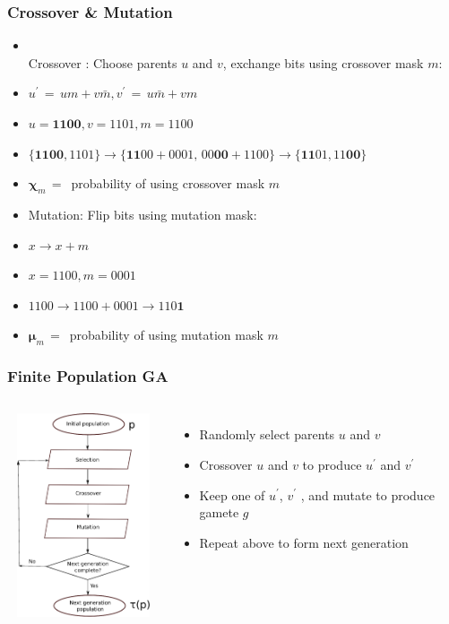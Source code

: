 \documentclass[aspectratio=169]{beamer}
\begin{document}
  \begin{frame}
    \frametitle{Crossover \& Mutation}    
    \begin{itemize}    
      \item{ \mbox{}\\[-0.2in] Crossover : Choose parents $u$ and $v$, exchange bits using crossover mask $m$: }
      \item{$u^\prime \,=\, um + v\bar{m} , v^\prime \,=\, u\bar{m} + vm$}      
      \item{$u = \bm{1100}, v = 1101, m = 1100$}
      \item{$\{\bm{1100}, 1101\} \to \{\bm{11}00 + 0001,\, 00\bm{00} + 1100\} \to \{\bm{11}01, 11\bm{00}\}$}
      \item{$\bm{\chi}_m \,=\,$ probability of using crossover mask $m$ }
      \vspace{0.06in}%
      \item{Mutation: Flip bits using mutation mask:}
      \item{$x \to x + m$}
      \item{$x = 1100, m = 0001$}
      \item{$1100 \to 1100 + 0001 \to 110\bm{1}$}
      \item{$\bm{\mu}_m \,=\,$ probability of using mutation mask $m$ }
    \end{itemize}
  \end{frame}
  
  \begin{frame}
    \frametitle{Finite Population GA}
    \begin{columns}
	  \centering
	  \includegraphics[height=6cm, width=5cm]{figures/eps/GA.eps}
	\begin{itemize}
	  \item{Randomly select parents $u$ and $v$ }
	  \item{Crossover $u$ and $v$ to produce $u^\prime$ and $v^\prime$ }
	  \item{Keep one of $u^\prime$, $v^\prime$ , and mutate to produce gamete $g$}
	  \item{Repeat above to form next generation}              
	\end{itemize}
    \end{columns} 
  \end{frame}
  
\end{document}
